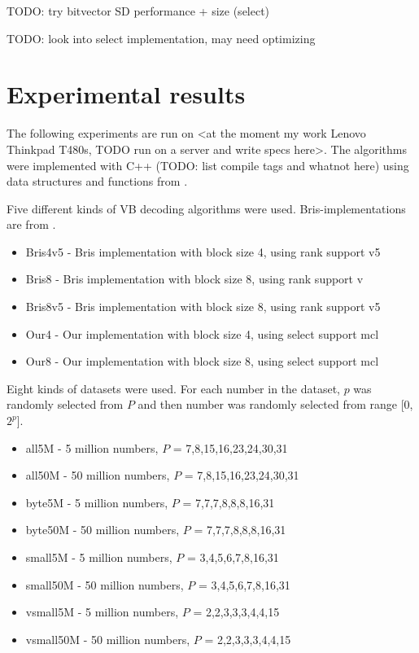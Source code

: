 TODO: try bitvector SD performance + size (select)

TODO: look into select implementation, may need optimizing

\chapter{Experimental results}

The following experiments are run on <at the moment my work Lenovo Thinkpad T480s, TODO run on a server and write specs here>. The algorithms 
were implemented with C++ (TODO: list compile tags and whatnot here) using data structures and functions from \citep{gbmp2014sea}. 



Five different kinds of VB decoding algorithms were used. Bris-implementations are from \citep{Bri09}. 
\begin{itemize}
  \item Bris4v5 - Bris implementation with block size 4, using rank support v5
  \item Bris8 - Bris implementation with block size 8, using rank support v
  \item Bris8v5 - Bris implementation with block size 8, using rank support v5
  \item Our4 - Our implementation with block size 4, using select support mcl
  \item Our8 - Our implementation with block size 8, using select support mcl
\end{itemize}

Eight kinds of datasets were used. For each number in the dataset, $p$ was randomly selected from $P$ and then number was randomly selected from
range [0,$2^p$].

\begin{itemize}
  \item all5M - 5 million numbers, $P$ = {7,8,15,16,23,24,30,31}
  \item all50M - 50 million numbers, $P$ = {7,8,15,16,23,24,30,31}
  \item byte5M - 5 million numbers, $P$ = {7,7,7,8,8,8,16,31}
  \item byte50M - 50 million numbers, $P$ = {7,7,7,8,8,8,16,31}
  \item small5M - 5 million numbers, $P$ = {3,4,5,6,7,8,16,31}
  \item small50M - 50 million numbers, $P$ = {3,4,5,6,7,8,16,31}
  \item vsmall5M - 5 million numbers, $P$ = {2,2,3,3,3,4,4,15}
  \item vsmall50M - 50 million numbers, $P$ = {2,2,3,3,3,4,4,15}
\end{itemize}

